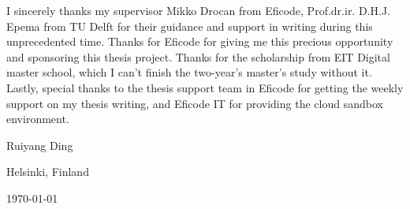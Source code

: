 I sincerely thanks my supervisor Mikko Drocan from Eficode, Prof.dr.ir. D.H.J. Epema from TU Delft for their guidance and support in writing during this unprecedented time. Thanks for Eficode for giving me this precious opportunity and sponsoring this thesis project. Thanks for the scholarship from EIT Digital master school, which I can't finish the two-year's master's study without it. Lastly, special thanks to the thesis support team in Eficode for getting the weekly support on my thesis writing, and Eficode IT for providing the cloud sandbox environment.
\vspace{1\baselineskip}


\noindent
Ruiyang Ding

\vspace{1\baselineskip}

\noindent
Helsinki, Finland

\noindent
\today
